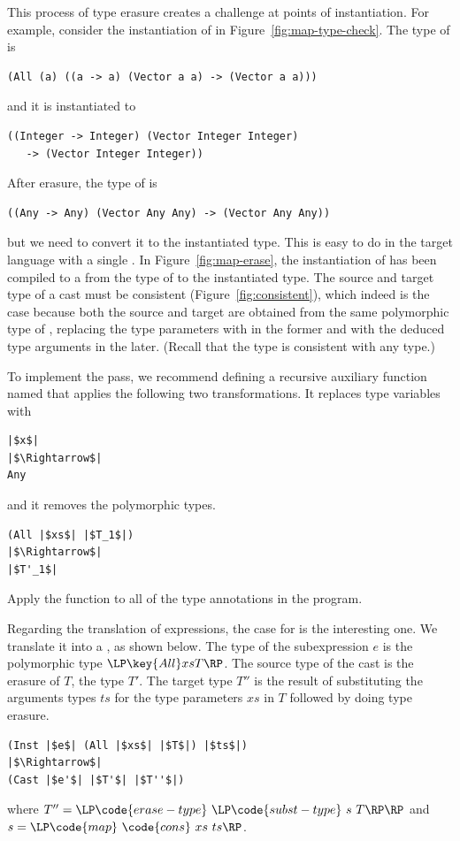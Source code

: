 \documentclass[7x10,nocrop]{TimesAPriori_MIT}%
\begin{document}
This process of type erasure creates a challenge at points of
instantiation. For example, consider the instantiation of
 in Figure~\ref{fig:map-type-check}.
The type of  is
\begin{lstlisting}
(All (a) ((a -> a) (Vector a a) -> (Vector a a)))
\end{lstlisting}
and it is instantiated to 
\begin{lstlisting}
((Integer -> Integer) (Vector Integer Integer)
   -> (Vector Integer Integer))
\end{lstlisting}
After erasure, the type of  is
\begin{lstlisting}
((Any -> Any) (Vector Any Any) -> (Vector Any Any))
\end{lstlisting}
but we need to convert it to the instantiated type.  This is easy to
do in the target language \LangCast{} with a single .  In
Figure~\ref{fig:map-erase}, the instantiation of 
has been compiled to a  from the type of  to
the instantiated type. The source and target type of a cast must be
consistent (Figure~\ref{fig:consistent}), which indeed is the case
because both the source and target are obtained from the same
polymorphic type of , replacing the type parameters with
 in the former and with the deduced type arguments in the
later. (Recall that the  type is consistent with any type.)

To implement the  pass, we recommend defining a
recursive auxiliary function named  that applies the
following two transformations. It replaces type variables with
\begin{lstlisting}
|$x$|
|$\Rightarrow$|
Any
\end{lstlisting}
and it removes the polymorphic  types.
\begin{lstlisting}
(All |$xs$| |$T_1$|)
|$\Rightarrow$|
|$T'_1$|
\end{lstlisting}
Apply the  function to all of the type annotations in
the program.

Regarding the translation of expressions, the case for  is
the interesting one. We translate it into a , as shown
below. The type of the subexpression $e$ is the polymorphic type
$\LP\key{All} xs T\RP$. The source type of the cast is the erasure of
$T$, the type $T'$. The target type $T''$ is the result of
substituting the arguments types $ts$ for the type parameters $xs$ in
$T$ followed by doing type erasure.
\begin{lstlisting}
(Inst |$e$| (All |$xs$| |$T$|) |$ts$|)
|$\Rightarrow$|
(Cast |$e'$| |$T'$| |$T''$|)
\end{lstlisting}
where $T'' = \LP\code{erase-type}~\LP\code{subst-type}~s~T\RP\RP$
and $s = \LP\code{map}~\code{cons}~xs~ts\RP$.
\end{document}

